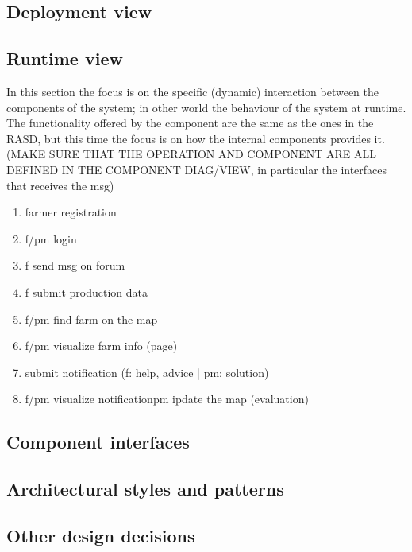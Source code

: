\subsection{Deployment view}

\subsection{Runtime view}

In this section the focus is on the specific (dynamic) interaction between the components of the system; in other world the behaviour of the system at runtime.
The functionality offered by the component are the same as the ones in the RASD, but this time the focus is on how the internal components provides it.
(MAKE SURE THAT THE OPERATION AND COMPONENT ARE ALL DEFINED IN THE COMPONENT DIAG/VIEW, in particular the interfaces that receives the msg)

\begin{enumerate}
    \item farmer registration
    \item f/pm login
    \item f send msg on forum
    \item f submit production data
    \item f/pm find farm on the map
    \item f/pm visualize farm info (page)
    \item submit notification (f: help, advice | pm: solution)
    \item f/pm visualize notificationpm ipdate the map (evaluation)
\end{enumerate}

\subsection{Component interfaces}

\subsection{Architectural styles and patterns}

\subsection{Other design decisions}


